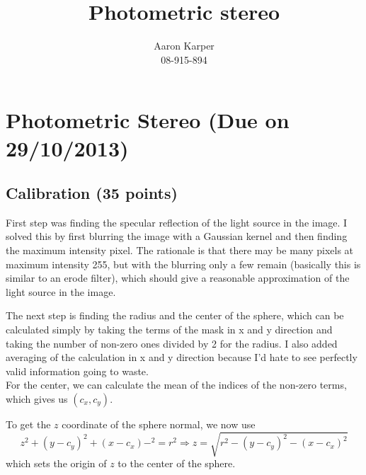 \documentclass{paper}
\title{Photometric stereo}
\author{Aaron Karper\\08-915-894}
\begin{document}
\maketitle


%

\section{Photometric Stereo (Due on 29/10/2013)}

\subsection{Calibration (35 points)}
First step was finding the specular reflection of the light source in the image. I solved this by first blurring the image with a Gaussian kernel and then finding the maximum intensity pixel. The rationale is that there may be many pixels at maximum intensity 255, but with the blurring only a few remain (basically this is similar to an erode filter), which should give a reasonable approximation of the light source in the image.

The next step is finding the radius and the center of the sphere, which can be calculated simply by taking the terms of the mask in x and y direction and taking the number of non-zero ones divided by 2 for the radius. I also added averaging of the calculation in x and y direction because I'd hate to see perfectly valid information going to waste.\\
For the center, we can calculate the mean of the indices of the non-zero terms, which gives us $(c_x, c_y)$.

To get the $z$ coordinate of the sphere normal, we now use
\[ z^2+(y-c_y)^2+(x-c_x)-^2 = r^2 \Rightarrow z = \sqrt{r^2-(y-c_y)^2-(x-c_x)^2}\]
which sets the origin of $z$ to the center of the sphere.
\end{document}
